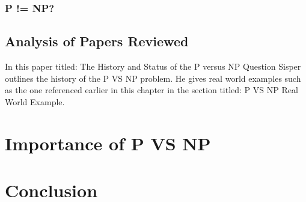 \documentclass{report}
\begin{document}
\subsection{P != NP?}
\section{Analysis of Papers Reviewed}
In this paper titled: The History and Status of the P versus NP Question Sisper outlines the history of the P VS NP problem.  He gives real world examples such as the one referenced earlier in this chapter in the section titled: P VS NP Real World Example.
\chapter{Importance of P VS NP}
\chapter{Conclusion}



\end{document}
